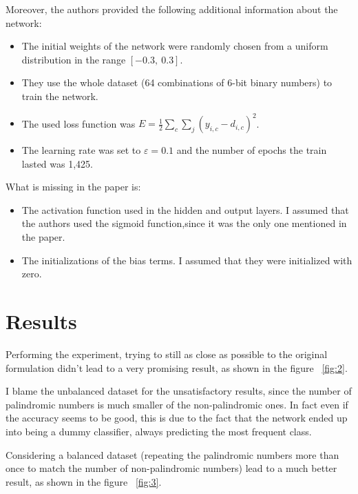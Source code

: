 \documentclass{article}
\begin{document}
    Moreover, the authors provided the following additional information about the network:

    \begin{itemize}
        \itemsep0em %
        \item The initial weights of the network were randomly chosen from a uniform distribution in the range $[-0.3,\ 0.3]$.
        \item They use the whole dataset (64 combinations of 6-bit binary numbers) to train the network.
        \item The used loss function was $E = \frac{1}{2}\sum_{c}\sum_{j}{\left(y_{i,c} - d_{i,c}\right)^2}$.
        \item The learning rate was set to $\varepsilon = 0.1$ and the number of epochs the train lasted was 1,425.
    \end{itemize}

    \noindent What is missing in the paper is:

    \begin{itemize}
        \itemsep0em %
        \item The activation function used in the hidden and output layers.
            I assumed that the authors used the sigmoid function,since it was the only one mentioned in the paper.
        \item The initializations of the bias terms.
            I assumed that they were initialized with zero.
    \end{itemize}

    \section{Results}\label{sec:results}

    Performing the experiment, trying to still as close as possible to the original formulation didn't lead
    to a very promising result, as shown in the figure ~\ref{fig:2}.

    \noindent I blame the unbalanced dataset for the unsatisfactory results, since the number of palindromic numbers is much smaller
    of the non-palindromic ones.
    In fact even if the accuracy seems to be good, this is due to the fact that the network
    ended up into being a dummy classifier, always predicting the most frequent class.

    \noindent Considering a balanced dataset (repeating the palindromic numbers more than once to match the number of non-palindromic numbers)
    lead to a much better result, as shown in the figure ~\ref{fig:3}.
\end{document}
